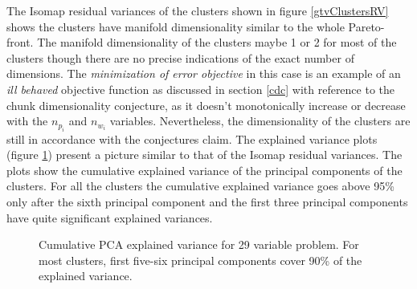The Isomap residual variances of the clusters shown in figure
\ref{gtvClustersRV} shows the clusters have manifold dimensionality similar
to the whole Pareto-front. The manifold dimensionality of the clusters
maybe 1 or 2 for most of the clusters though there are no precise
indications of the exact number of dimensions. The {\em minimization of
  error objective} in this case is an example of an {\em ill behaved}
objective function as discussed in section \ref{cdc} with reference to the
chunk dimensionality conjecture, as it doesn't monotonically increase or
decrease with the $n_{p_i}$ and $n_{w_i}$ variables. Nevertheless, the
dimensionality of the clusters are still in accordance with the conjectures
claim. The explained variance plots (figure \ref{gtvClustersEV}) present a
picture similar to that of the Isomap residual variances. The plots show
the cumulative explained variance of the principal components of the
clusters. For all the clusters the cumulative explained variance goes above
95\% only after the sixth principal component and the first three principal
components have quite significant explained variances.




\begin{figure}[ht]\begin{center}
 \caption{Cumulative PCA explained variance for 29 variable problem. For
  most clusters, first five-six principal components cover 90\% of the
  explained variance.}
 \label{gtvClustersEV}
\end{center}\end{figure}
 

